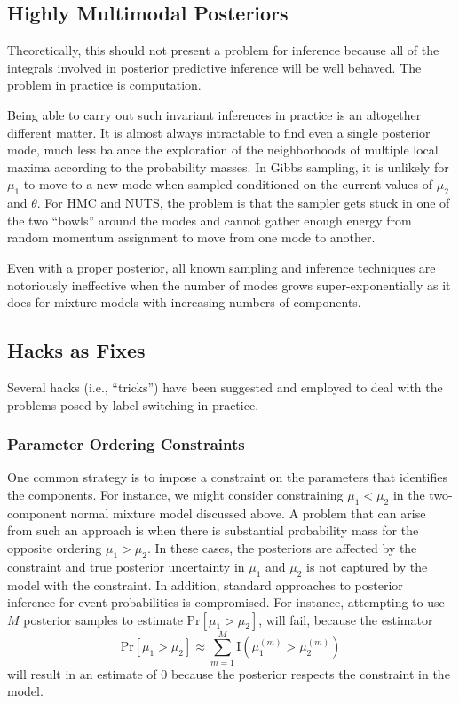 \subsection{Highly Multimodal Posteriors}

Theoretically, this should not present a problem for inference because
all of the integrals involved in posterior predictive inference will
be well behaved. The problem in practice is computation. 

Being able to carry out such invariant inferences in practice is an
altogether different matter.  It is almost always intractable to find
even a single posterior mode, much less balance the exploration of the
neighborhoods of multiple local maxima according to the probability
masses. In Gibbs sampling, it is unlikely for $\mu_1$
to move to a new mode when sampled conditioned on the current values
of $\mu_2$ and $\theta$. For HMC and NUTS, the problem is that the
sampler gets stuck in one of the two ``bowls'' around the modes and
cannot gather enough energy from random momentum assignment to move
from one mode to another.

Even with a proper posterior, all known sampling and inference
techniques are notoriously ineffective when the number of modes grows
super-exponentially as it does for mixture models with increasing
numbers of components.

\subsection{Hacks as Fixes}

Several hacks (i.e., ``tricks'') have been suggested and employed to
deal with the problems posed by label switching in practice.

\subsubsection{Parameter Ordering Constraints}

One common strategy is to impose a constraint on the parameters that
identifies the components.  For instance, we might consider
constraining $\mu_1 < \mu_2$ in the two-component normal mixture model
discussed above.  A problem that can arise from such an approach is
when there is substantial probability mass for the opposite ordering
$\mu_1 > \mu_2$.  In these cases, the posteriors are affected by
the constraint and true posterior uncertainty in $\mu_1$ and $\mu_2$
is not captured by the model with the constraint.  In addition,
standard approaches to posterior inference for event probabilities is
compromised.  For instance, attempting to use $M$ posterior samples to
estimate $\mbox{Pr}[\mu_1 > \mu_2]$, will fail, because the estimator
\[
\mbox{Pr}[\mu_1 > \mu_2] 
\approx 
\sum_{m=1}^M \mbox{I}(\mu_1^{(m)} > \mu_2^{(m)})
\]
will result in an estimate of 0 because the posterior respects the
constraint in the model.  

